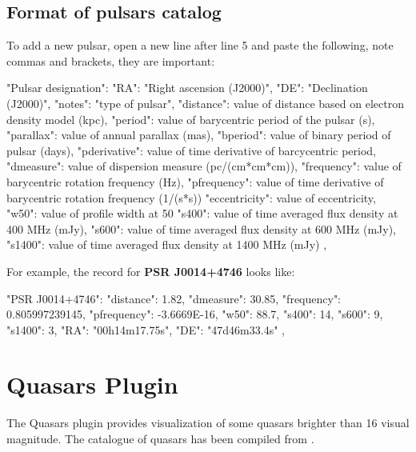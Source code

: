 \newpage
\subsection{Format of pulsars catalog}
\label{sec:plugins:Pulsars:format}

To add a new pulsar, open a new line after line 5 and paste the following, note commas and brackets, they are important:

\begin{configfile}
"Pulsar designation":
{
    "RA": "Right ascension (J2000)",
    "DE": "Declination (J2000)",
    "notes": "type of pulsar",
    "distance": value of distance based on electron density 
                model (kpc),
    "period": value of barycentric period of the pulsar (s),
    "parallax": value of annual parallax (mas),
    "bperiod": value of binary period of pulsar (days),
    "pderivative": value of time derivative of barcycentric 
                   period,
    "dmeasure": value of dispersion measure (pc/(cm*cm*cm)),
    "frequency": value of barycentric rotation frequency (Hz),
    "pfrequency": value of time derivative of barycentric 
                  rotation frequency (1/(s*s))
    "eccentricity": value of eccentricity,                   
    "w50": value of profile width at 50%
    "s400": value of time averaged flux density at 
            400 MHz (mJy),
    "s600": value of time averaged flux density at 
            600 MHz (mJy),
    "s1400": value of time averaged flux density at 
             1400 MHz (mJy)    
},
\end{configfile}

\noindent For example, the record for \textbf{PSR J0014+4746} looks like:
\begin{configfile}
"PSR J0014+4746":
{
    "distance": 1.82,
    "dmeasure": 30.85,
    "frequency": 0.805997239145,
    "pfrequency": -3.6669E-16,
    "w50": 88.7,
    "s400": 14,
    "s600": 9,
    "s1400": 3,
    "RA": "00h14m17.75s",
    "DE": "47d46m33.4s"
},
\end{configfile}

\newpage
\section{Quasars Plugin}
\label{sec:plugins:Quasars}

\noindent The Quasars plugin provides visualization of some quasars brighter than 16 visual magnitude. 
The catalogue of quasars has been compiled from .

